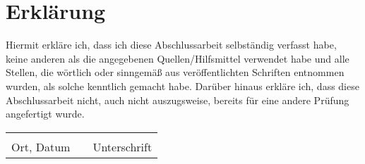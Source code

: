 \section*{Erklärung}

Hiermit erkläre ich, dass ich diese Abschlussarbeit selbständig verfasst
habe, keine anderen als die angegebenen Quellen/Hilfsmittel verwendet
habe und alle Stellen, die wörtlich oder sinngemäß aus veröffentlichten
Schriften entnommen wurden, als solche kenntlich gemacht habe. Darüber
hinaus erkläre ich, dass diese Abschlussarbeit nicht, auch nicht auszugsweise,
bereits für eine andere Prüfung angefertigt wurde.\\
\begin{tabular}{lp{3em}l}
\vspace{1cm}
 \hspace{6cm}   && \hspace{6cm} \\\cline{1-1}\cline{3-3}
 Ort, Datum     && Unterschrift
\end{tabular}


\blankpage





%
%
